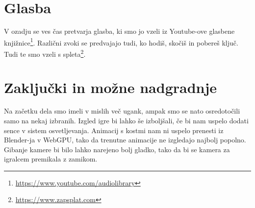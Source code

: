 \documentclass[a4paper,12pt]{article}
\begin{document}
\section{Glasba}
V ozadju se ves čas pretvarja glasba, ki smo jo vzeli iz Youtube-ove glasbene knjižnice\footnote{\url{https://www.youtube.com/audiolibrary}}. Različni zvoki se predvajajo tudi, ko hodiš, skočiš in pobereš ključ. Tudi te smo vzeli s spleta\footnote{\url{https://www.zapsplat.com}}.

\section{Zaključki in možne nadgradnje}
Na začetku dela smo imeli v mislih več ugank, ampak smo se nato osredotočili samo na nekaj izbranih. Izgled igre bi lahko še izboljšali, če bi nam uspelo dodati sence v sistem osvetljevanja. Animacij s kostmi nam ni uspelo prenesti iz Blender-ja v WebGPU, tako da trenutne animacije ne izgledajo najbolj popolno. Gibanje kamere bi bilo lahko narejeno bolj gladko, tako da bi se kamera za igralcem premikala z zamikom.
\end{document}
